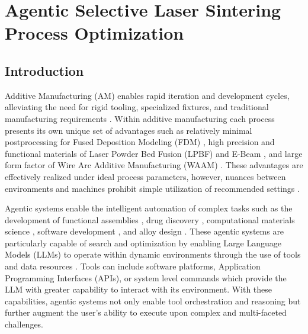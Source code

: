 \chapter{Agentic Selective Laser Sintering Process Optimization}
\label{chapter:agentic_sls}

\section{Introduction}

Additive Manufacturing (AM) enables rapid iteration and development cycles,
alleviating the need for rigid tooling, specialized fixtures, and traditional
manufacturing requirements \cite{beaman_additive_2020, zhao_laser_2023,
kumar_selective_2003}. Within additive manufacturing each process presents its
own unique set of advantages such as relatively minimal postprocessing for Fused
Deposition Modeling (FDM) \cite{ngo_additive_2018}, high precision and
functional materials of Laser Powder Bed Fusion (LPBF) \cite{zhao_laser_2023}
and E-Beam \cite{galati_literature_2018}, and large form factor of Wire Arc
Additive Manufacturing (WAAM) \cite{li_comprehensive_2022}. These advantages are
effectively realized under ideal process parameters, however, nuances between
environments and machines prohibit simple utilization of recommended settings
\cite{brown_interlaboratory_2016}.

Agentic systems enable the intelligent automation of complex tasks such as the
development of functional assemblies \cite{pak_rocketsmith_2026,
barkley_cadsmith_2026}, drug discovery \cite{ock_large_2025}, computational
materials science \cite{chaudhari_modular_2026}, software development
\cite{han_tdflow_2026}, and alloy design \cite{pak_agentic_2026,
ghafarollahi_automating_2025, ghafarollahi_rapid_2025}. These agentic systems
are particularly capable of search and optimization by enabling Large Language
Models (LLMs) to operate within dynamic environments through the use of tools
and data resources \cite{pak_agentic_2026, pak_rocketsmith_2026}. Tools can
include software platforms, Application Programming Interfaces (APIs), or system
level commands which provide the LLM with greater capability to interact with
its environment. With these capabilities, agentic systems not only enable tool
orchestration and reasoning but further augment the user's ability to execute
upon complex and multi-faceted challenges.

